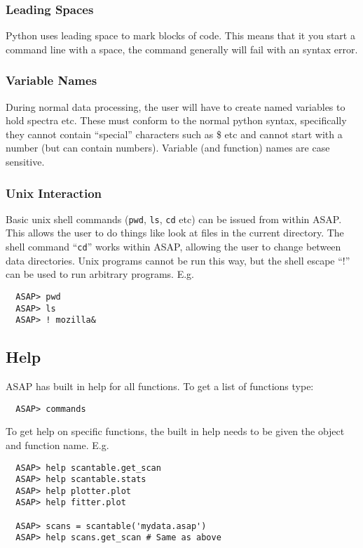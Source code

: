 \documentclass[11pt]{article}
\newcommand{\cmd}[1]{{\tt #1}}
\begin{document}
\subsubsection{Leading Spaces}

Python uses leading space to mark blocks of code. This means that it
you start a command line with a space, the command generally will
fail with an syntax error.

\subsubsection{Variable Names}

During normal data processing, the user will have to create named
variables to hold spectra etc. These must conform to the normal python
syntax, specifically they cannot contain ``special'' characters such
as \@ \$ etc and cannot start with a number (but can contain numbers).
Variable (and function) names are case sensitive.

\subsubsection{Unix Interaction}

Basic unix shell commands (\cmd{pwd}, \cmd{ls}, \cmd{cd} etc) can be
issued from within ASAP. This allows the user to do things like look
at files in the current directory. The shell command ``\cmd{cd}''
works within ASAP, allowing the user to change between data
directories. Unix programs cannot be run this way, but the shell
escape ``$!$'' can be used to run arbitrary programs. E.g.

\begin{verbatim}
  ASAP> pwd
  ASAP> ls
  ASAP> ! mozilla&
\end{verbatim}

\subsection{Help}

ASAP has built in help for all functions. To get a list of functions type:

\begin{verbatim}
  ASAP> commands
\end{verbatim}

To get help on specific functions, the built in help needs to be given
the object and function name. E.g.

\begin{verbatim}
  ASAP> help scantable.get_scan
  ASAP> help scantable.stats
  ASAP> help plotter.plot
  ASAP> help fitter.plot

  ASAP> scans = scantable('mydata.asap')
  ASAP> help scans.get_scan # Same as above
\end{verbatim}
\end{document}
